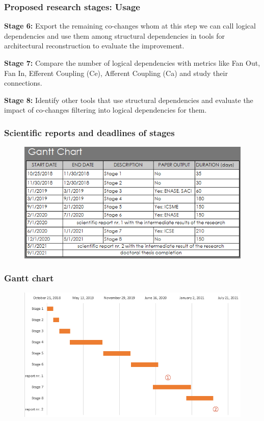 \documentclass{beamer}
\begin{document}
 \begin{frame}
\frametitle{Proposed research stages: Usage }

\textbf{Stage 6:} Export the remaining co-changes whom at this step we can call logical dependencies and use them among structural dependencies in tools for architectural reconstruction to evaluate the improvement.

\textbf{Stage 7:} Compare the number of logical dependencies with metrics like Fan Out, Fan In, Efferent Coupling (Ce), Afferent Coupling (Ca) and study their connections.

\textbf{Stage 8:} Identify other tools that use structural dependencies and evaluate the impact of co-changes filtering into logical dependencies for them.

\end{frame}


 \begin{frame}
\frametitle{ Scientific reports and deadlines of stages}

\begin{figure}[H]
\centering
\includegraphics[width=\textwidth]{gantt_chart.PNG}
\label{fig:gantt1}
\end{figure}

\end{frame}



 \begin{frame}
\frametitle{Gantt chart}

\begin{figure}[H]
\centering
\includegraphics[width=\textwidth]{gantt_plot.PNG}
\label{fig:gantt2}
\end{figure}

\end{frame}
\end{document}
